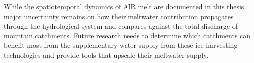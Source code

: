 While the spatiotemporal dynamics of \ac{AIR} melt are documented in this thesis,
major uncertainty remains on how their meltwater contribution propagates through the hydrological system and
compares against the total discharge of mountain catchments. Future research needs to determine which catchments
can benefit most from the supplementary water supply from these ice harvesting technologies and provide tools that
upscale their meltwater supply.

